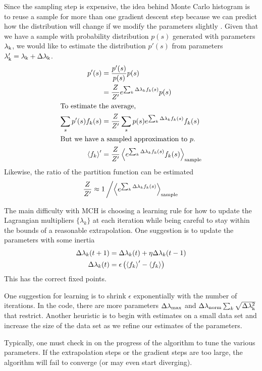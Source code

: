 \documentclass[aps,prl,twocolumn]{revtex4-1}
\begin{document}
Since the sampling step is expensive, the idea behind Monte Carlo histogram is to reuse a sample for more than one gradient descent step because we can predict how the distribution will change if we modify the parameters slightly \cite{Broderick:2007wq}. Given that we have a sample with probability distribution $p(s)$ generated with parameters $\lambda_{\rm k}$, we would like to estimate the distribution $p'(s)$ from parameters $\lambda_{\rm k}' = \lambda_{\rm k}+\Delta\lambda_{\rm k}$.
\begin{align}
	p'(s) &= \frac{p'(s)}{p(s)}p(s)\\
		&= \frac{Z}{Z'}e^{\sum_k \Delta\lambda_k f_k(s)} p(s)\\
\intertext{To estimate the average,}
	\sum_s p'(s) f_k(s) &= \frac{Z}{Z'} \sum_s p(s) e^{\sum_k \Delta\lambda_k f_k(s)} f_k(s)\\
\intertext{But we have a sampled approximation to $p$.}
	\left<f_k\right>' &= \frac{Z}{Z'} \left<e^{\sum_k \Delta\lambda_k f_k(s)} f_k(s)\right>_{\rm sample}
\end{align}
Likewise, the ratio of the partition function can be estimated
\begin{align}
	\frac{Z}{Z'} \approx 1\left/\left<e^{\sum_k \Delta\lambda_k f_k(s)}\right>_{\rm sample}\right.
\end{align}

The main difficulty with MCH is choosing a learning rule for how to update the Lagrangian multipliers $\{\lambda_k\}$ at each iteration while being careful to stay within the bounds of a reasonable extrapolation. One suggestion is to update the parameters with some inertia
\begin{align}
	\Delta\lambda_k(t+1) &= \Delta \lambda_k(t) + \eta \Delta\lambda_k(t-1)\label{eq:mch learn1}\\
	\Delta \lambda_k(t) &= \epsilon\left(\left<f_k\right>'-\left<f_k\right>\right)\label{eq:mch learn2}
\end{align}
This has the correct fixed points. 

One suggestion for learning is to shrink $\epsilon$ exponentially with the number of iterations. In the code, there are more parameters $\Delta\lambda_{\rm max}$ and $\Delta\lambda_{\rm norm}\sum_k \sqrt{\Delta\lambda_{\rm k}^2}$ that restrict. Another heuristic is to begin with estimates on a small data set and increase the size of the data set as we refine our estimates of the parameters.

Typically, one must check in on the progress of the algorithm to tune the various parameters. If the extrapolation steps or the gradient steps are too large, the algorithm will fail to converge (or may even start diverging).
\end{document}
